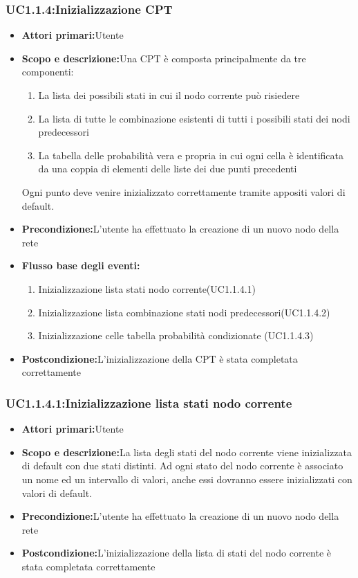 \subsubsection{UC1.1.4:Inizializzazione CPT}
\begin{itemize}
	\item{\textbf{Attori primari:}Utente}
	\item{\textbf{Scopo e descrizione:}Una CPT è composta principalmente da tre componenti:
		\begin{enumerate}
			\item{La lista dei possibili stati in cui il nodo corrente può risiedere}
			\item{La lista di tutte le combinazione esistenti di tutti i possibili stati dei nodi predecessori}
			\item{La tabella delle probabilità vera e propria in cui ogni cella è identificata da una coppia di elementi delle liste dei due punti precedenti}
		\end{enumerate}			
		Ogni punto deve venire inizializzato correttamente tramite appositi valori di default.
	}
	\item{\textbf{Precondizione:}L'utente ha effettuato la creazione di un nuovo nodo della rete}
	\item{\textbf{Flusso base degli eventi:}}
	\begin{enumerate}
		\item{Inizializzazione lista stati nodo corrente(UC1.1.4.1)}
		\item{Inizializzazione lista combinazione stati nodi predecessori(UC1.1.4.2)}
		\item{Inizializzazione celle tabella probabilità condizionate (UC1.1.4.3)}
	\end{enumerate}
	\item{\textbf{Postcondizione:}L'inizializzazione della CPT è stata completata correttamente}
\end{itemize}
\subsubsection{UC1.1.4.1:Inizializzazione lista stati nodo corrente}
\begin{itemize}
	\item{\textbf{Attori primari:}Utente}
	\item{\textbf{Scopo e descrizione:}La lista degli stati del nodo corrente viene inizializzata di default con due stati distinti. Ad ogni stato del nodo corrente è associato un nome ed un intervallo di valori, anche essi dovranno essere inizializzati con valori di default.}
	\item{\textbf{Precondizione:}L'utente ha effettuato la creazione di un nuovo nodo della rete}
	\item{\textbf{Postcondizione:}L'inizializzazione della lista di stati del nodo corrente è stata completata correttamente}
\end{itemize}
